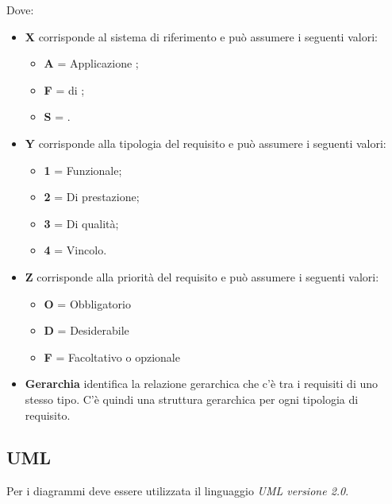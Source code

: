 Dove:
\begin{itemize}
 \item \textbf{X} corrisponde al sistema di riferimento e può assumere i seguenti valori:
	\begin{itemize}
	 \item[] \textbf{A} = Applicazione ;
	 \item[] \textbf{F} =  di ;
	 \item[] \textbf{S} = .
	\end{itemize}

 \item \textbf{Y} corrisponde alla tipologia del requisito e può assumere i seguenti valori:
	\begin{itemize}
	 \item[] \textbf{1} = Funzionale;
	 \item[] \textbf{2} = Di prestazione;
	 \item[] \textbf{3} = Di qualità;
	 \item[] \textbf{4} = Vincolo.
	\end{itemize}

 \item \textbf{Z} corrisponde alla priorità del requisito e può assumere i seguenti valori:
	\begin{itemize}
	 \item[] \textbf{O} = Obbligatorio
	 \item[] \textbf{D} = Desiderabile
	 \item[] \textbf{F} = Facoltativo o opzionale
	\end{itemize}

 \item \textbf{Gerarchia} identifica la relazione gerarchica che c'è tra i requisiti di uno stesso tipo. C'è quindi una struttura gerarchica per ogni tipologia di requisito.
\end{itemize}

\subsection{UML}

Per i diagrammi deve essere utilizzata il linguaggio \emph{UML versione 2.0}.
